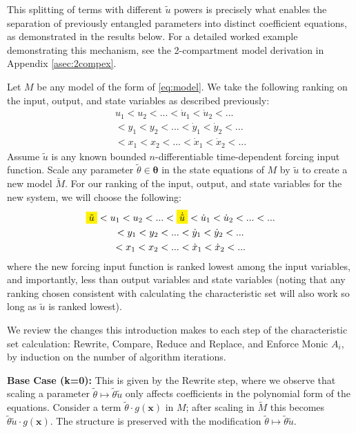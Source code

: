 \documentclass[a4paper,fleqn]{cas-dc}
\newcommand{\mathcolorbox}[2]{\colorbox{#1}{$\displaystyle #2$}}
\theoremstyle{definition}
\begin{document}
This splitting of terms with different $\tilde{u}$ powers is precisely what enables the separation of previously entangled parameters into distinct coefficient equations, as demonstrated in the results below. For a detailed worked example demonstrating this mechanism, see the 2-compartment model derivation in Appendix \ref{asec:2compex}.


\begin{pfs} 
    Let $M$ be any model of the form of \cref{eq:model}. 
    We take the following ranking on the input, output, and state variables as described previously:
    \begin{multline*}
        u_1 < u_2 < ... < \dot{u}_1 < \dot{u}_2 < ...\\  < y_1 < y_2< ... <\dot{y}_1 < \dot{y}_2 < ...\\  < x_1 < x_2 < ...<\dot{x}_1 < \dot{x}_2 < ...
    \end{multline*}
    Assume $\tilde{u}$ is any known bounded $n$-differentiable time-dependent forcing input function.
    Scale any parameter $\tilde{\theta} \in \pmb{\theta}$ in the state equations of $M$ by $\tilde{u}$ to create a new model $\tilde{M}$.
    For our ranking of the input, output, and state variables for the new system, we will choose the following:
    \begin{multline*}
        \mathcolorbox{Yellow}{\tilde{u}} < u_1 < u_2 < ...< \mathcolorbox{Yellow}{\dot{\tilde{u}}} < \dot{u}_1 < \dot{u}_2 < ... < ...\\  < y_1 < y_2 < ... <\dot{y}_1 < \dot{y}_2 < ... \\< x_1 < x_2 < ...<\dot{x}_1 < \dot{x}_2 < ...
    \end{multline*}
    where the new forcing input function is ranked lowest among the input variables, and importantly, less than output variables and state variables (noting that any ranking chosen consistent with calculating the characteristic set will also work so long as $\tilde{u}$ is ranked lowest). 
    
    We review the changes this introduction makes to each step of the characteristic set calculation: Rewrite, Compare, Reduce and Replace, and Enforce Monic $A_i$, by induction on the number of algorithm iterations.
    
    \textbf{Base Case (k=0):} This is given by the Rewrite step, where we observe that scaling a parameter $\tilde{\theta} \mapsto \tilde{\theta}\tilde{u}$ only affects coefficients in the polynomial form of the equations. Consider a term $\tilde{\theta} \cdot g(\pmb{x})$ in $M$; after scaling in $\tilde{M}$ this becomes $\tilde{\theta}\tilde{u} \cdot g(\pmb{x})$. The structure is preserved with the modification $\tilde{\theta} \mapsto \tilde{\theta}\tilde{u}$.
    

\end{pfs}
\end{document}
